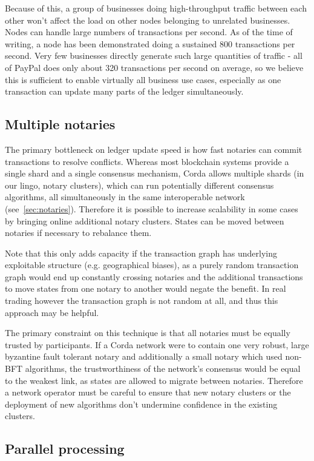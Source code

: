 \documentclass{article}
\begin{document}
Because of this, a group of businesses doing high-throughput traffic between each other won't affect the load on
other nodes belonging to unrelated businesses. Nodes can handle large numbers of transactions per second.
As of the time of writing, a node has been demonstrated doing a sustained 800 transactions per second. Very few
businesses directly generate such large quantities of traffic - all of PayPal does only about 320 transactions per
second on average\cite{PayPalTrafficVolume}, so we believe this is sufficient to enable virtually all business use
cases, especially as one transaction can update many parts of the ledger simultaneously.

\subsection{Multiple notaries}

The primary bottleneck on ledger update speed is how fast notaries can commit transactions to resolve conflicts.
Whereas most blockchain systems provide a single shard and a single consensus mechanism, Corda allows multiple
shards (in our lingo, notary clusters), which can run potentially different consensus algorithms, all
simultaneously in the same interoperable network (see~\cref{sec:notaries}). Therefore it is possible to increase
scalability in some cases by bringing online additional notary clusters. States can be moved between notaries if
necessary to rebalance them.

Note that this only adds capacity if the transaction graph has underlying exploitable structure (e.g. geographical
biases), as a purely random transaction graph would end up constantly crossing notaries and the additional
transactions to move states from one notary to another would negate the benefit. In real trading however the
transaction graph is not random at all, and thus this approach may be helpful.

The primary constraint on this technique is that all notaries must be equally trusted by participants. If a Corda
network were to contain one very robust, large byzantine fault tolerant notary and additionally a small notary
which used non-BFT algorithms, the trustworthiness of the network's consensus would be equal to the weakest link,
as states are allowed to migrate between notaries. Therefore a network operator must be careful to ensure that new
notary clusters or the deployment of new algorithms don't undermine confidence in the existing clusters.

\subsection{Parallel processing}
\end{document}
